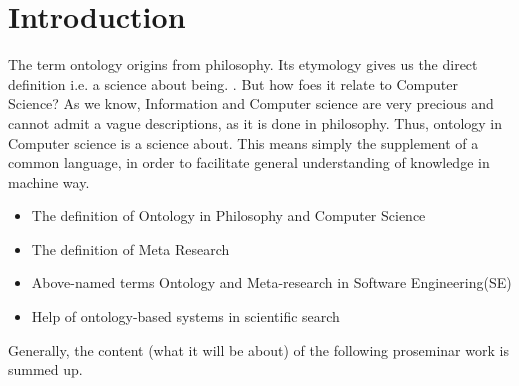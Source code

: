 
\section{Introduction}
\label{ch:Introduction}
The term ontology origins from philosophy. Its etymology gives us the direct definition i.e. a science about being. . But how foes it relate to Computer Science? As we know, Information and Computer science are very precious and cannot admit a vague descriptions, as it is done in philosophy. Thus, ontology in Computer science is a science about. This means simply the supplement of a common language, in order to facilitate general understanding of knowledge in machine way.    
   
\begin{itemize}
	\item The definition of Ontology in Philosophy and Computer Science
	\item The definition of Meta Research
	\item Above-named terms Ontology and Meta-research in Software Engineering(SE)
	\item Help of ontology-based systems in scientific search
\end{itemize}

Generally, the content (what it will be about) of the following proseminar work is summed up.